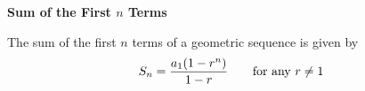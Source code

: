 {\bf Sum of the First $n$ Terms}
\vskip 6pt

The sum of the first $n$ terms of a geometric sequence is given by $$S_n={a_1(1-r^n)\over 1-r}\qquad\hbox{for any $r\neq 1$}$$

\vfill\eject
